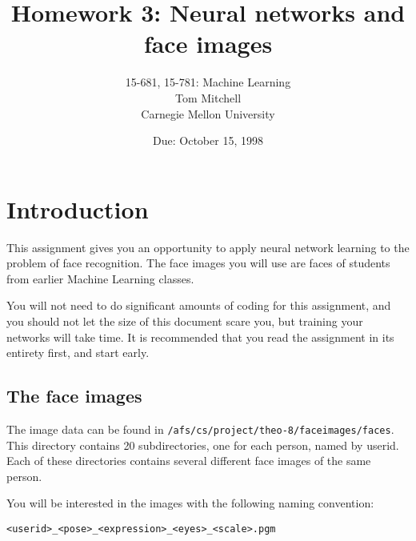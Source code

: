 \def\BOX#1{\fbox{\tt #1}}


\title{Homework 3: Neural networks and face images }
\author{15-681, 15-781: Machine Learning \\
Tom Mitchell \\
Carnegie Mellon University}
\date{Due: October 15, 1998}
\maketitle

\section{Introduction}

This assignment gives you an opportunity to apply neural network learning to
the problem of face recognition.  The face images you will use are faces of
students from earlier Machine Learning classes.

You will not need to do significant amounts of coding for this assignment,
and you should not let the size of this document scare you, but training
your networks will take time.  It is recommended that you read the
assignment in its entirety first, and start early.

\subsection{The face images}

The image data can be found in {\tt /afs/cs/project/theo-8/faceimages/faces}.
This directory contains 20 subdirectories, one for each person, named by
userid.  Each of these directories contains several different face images of
the same person.

You will be interested in the images with the following naming convention:

{\tt <userid>\_<pose>\_<expression>\_<eyes>\_<scale>.pgm}

